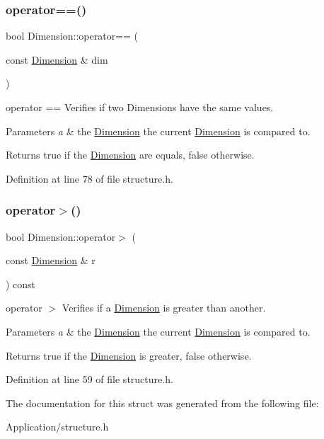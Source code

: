 \subsubsection{\texorpdfstring{operator==()}{operator==()}}
{\footnotesize\ttfamily bool Dimension\+::operator== (\begin{DoxyParamCaption}\item[{const \hyperlink{struct_dimension}{Dimension} \&}]{dim }\end{DoxyParamCaption})\hspace{0.3cm}{\ttfamily [inline]}}



operator == Verifies if two Dimensions have the same values. 


\begin{DoxyParams}{Parameters}
{\em a} & the \hyperlink{struct_dimension}{Dimension} the current \hyperlink{struct_dimension}{Dimension} is compared to. \\
\hline
\end{DoxyParams}
\begin{DoxyReturn}{Returns}
true if the \hyperlink{struct_dimension}{Dimension} are equals, false otherwise. 
\end{DoxyReturn}


Definition at line 78 of file structure.\+h.

\mbox{\label{struct_dimension_a31342c295eeff5e9fc89e47656192c5d}} 
\subsubsection{\texorpdfstring{operator$>$()}{operator>()}}
{\footnotesize\ttfamily bool Dimension\+::operator$>$ (\begin{DoxyParamCaption}\item[{const \hyperlink{struct_dimension}{Dimension} \&}]{r }\end{DoxyParamCaption}) const\hspace{0.3cm}{\ttfamily [inline]}}



operator $>$ Verifies if a \hyperlink{struct_dimension}{Dimension} is greater than another. 


\begin{DoxyParams}{Parameters}
{\em a} & the \hyperlink{struct_dimension}{Dimension} the current \hyperlink{struct_dimension}{Dimension} is compared to. \\
\hline
\end{DoxyParams}
\begin{DoxyReturn}{Returns}
true if the \hyperlink{struct_dimension}{Dimension} is greater, false otherwise. 
\end{DoxyReturn}


Definition at line 59 of file structure.\+h.



The documentation for this struct was generated from the following file\+:\begin{DoxyCompactItemize}
\item 
Application/structure.\+h\end{DoxyCompactItemize}
